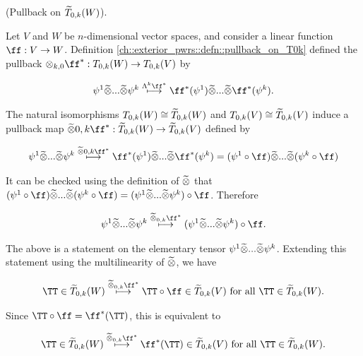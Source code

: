 \begin{deriv}
\label{ch::exterior_pwrs::deriv::pullback_on_tT0k}
    (Pullback on $\widetilde{T}_{0,k}(W)$).
    
    Let $V$ and $W$ be $n$-dimensional vector spaces, and consider a linear function $\ff:V \rightarrow W$. Definition \ref{ch::exterior_pwrs::defn::pullback_on_T0k} defined the pullback $\otimes_{k, 0} \ff^*: T_{0,k}(W) \rightarrow T_{0,k}(V)$ by
    
    \begin{align*}
        \psi^1 \totimes ... \totimes \psi^k \overset{\Lambda^k \ff^*}{\longmapsto} \ff^*(\psi^1) \totimes ... \totimes \ff^*(\psi^k).
    \end{align*}
    
    The natural isomorphisms $T_{0,k}(W) \cong \widetilde{T}_{0,k}(W)$ and $T_{0,k}(V) \cong \widetilde{T}_{0,k}(V)$ induce a pullback map ${\totimes{0,k} \ff^*:\tT_{0,k}(W) \rightarrow \tT_{0,k}(V)}$ defined by
    
    \begin{align*}
        \psi^1 \totimes ... \totimes \psi^k \overset{\totimes{0,k} \ff^*}{\longmapsto} \ff^*(\psi^1) \totimes ... \totimes \ff^*(\psi^k) = (\psi^1 \circ \ff) \totimes ... \totimes (\psi^k \circ \ff)
    \end{align*}
    
    It can be checked using the definition of $\widetilde{\otimes}$ that $(\psi^1 \circ \ff) \totimes ... \totimes (\psi^k \circ \ff) = (\psi^1 \totimes ... \totimes \psi^k) \circ \ff$. Therefore
    
    \begin{align*}
        \psi^1 \totimes ... \totimes \psi^k \overset{\totimes_{0,k} \ff^*}{\longmapsto}
        (\psi^1 \totimes ... \totimes \psi^k) \circ \ff.
    \end{align*}
    
    The above is a statement on the elementary tensor $\psi^1 \widetilde{\otimes} ... \widetilde{\otimes} \psi^k$. Extending this statement using the multilinearity of $\widetilde{\otimes}$, we have
    
    \begin{align*}
        \TT \in \tT_{0,k}(W) \overset{\totimes_{0,k} \ff^*}{\longmapsto} \TT \circ \ff \in \tT_{0,k}(V) \text{ for all $\TT \in \tT_{0,k}(W)$}.
    \end{align*}
    
    Since $\TT \circ \ff = \ff^*(\TT)$, this is equivalent to
    
    \begin{align*}
        \TT \in \tT_{0,k}(W) \overset{\totimes_{0,k} \ff^*}{\longmapsto} \ff^*(\TT) \in \tT_{0,k}(V) \text{ for all $\TT \in \tT_{0,k}(W)$}.
    \end{align*}
    

\end{deriv}
